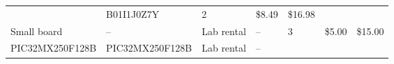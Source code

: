 \documentclass[]{article}
\begin{document}
\begin{appendices}
\begin{centering}
\begin{longtable}[]{@{}lllllll@{}}
\begin{minipage}[t]{0.10\columnwidth}
  \end{minipage} & \begin{minipage}[t]{0.17\columnwidth}\raggedright
  B01I1J0Z7Y\strut
  \end{minipage} & \begin{minipage}[t]{0.11\columnwidth}\raggedright
  2\strut
  \end{minipage} & \begin{minipage}[t]{0.06\columnwidth}\raggedright
  \$8.49\strut
  \end{minipage} & \begin{minipage}[t]{0.07\columnwidth}\raggedright
  \$16.98\strut
  \end{minipage}\tabularnewline
  \begin{minipage}[t]{0.15\columnwidth}\raggedright
  Small board\strut
  \end{minipage} & \begin{minipage}[t]{0.15\columnwidth}\raggedright
  --\strut
  \end{minipage} & \begin{minipage}[t]{0.10\columnwidth}\raggedright
  Lab rental\strut
  \end{minipage} & \begin{minipage}[t]{0.17\columnwidth}\raggedright
  --\strut
  \end{minipage} & \begin{minipage}[t]{0.11\columnwidth}\raggedright
  3\strut
  \end{minipage} & \begin{minipage}[t]{0.06\columnwidth}\raggedright
  \$5.00\strut
  \end{minipage} & \begin{minipage}[t]{0.07\columnwidth}\raggedright
  \$15.00\strut
  \end{minipage}\tabularnewline
  \begin{minipage}[t]{0.15\columnwidth}\raggedright
  PIC32MX250F128B\strut
  \end{minipage} & \begin{minipage}[t]{0.15\columnwidth}\raggedright
  PIC32MX250F128B\strut
  \end{minipage} & \begin{minipage}[t]{0.10\columnwidth}\raggedright
  Lab rental\strut
  \end{minipage} & \begin{minipage}[t]{0.17\columnwidth}\raggedright
  --\strut
  \end{minipage} & \begin{minipage}[t]{0.11\columnwidth}\raggedright

\end{minipage}
\end{longtable}
\end{centering}
\end{appendices}
\end{document}
